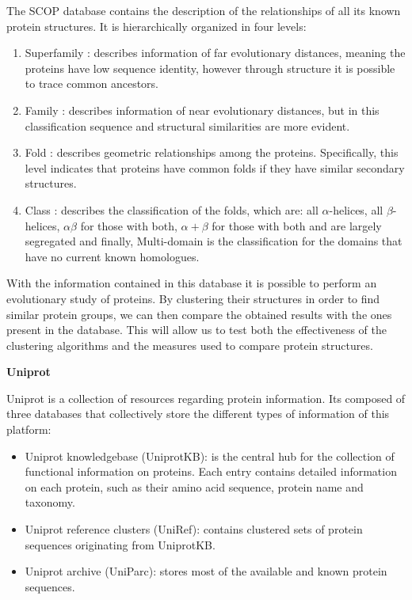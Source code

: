 The \gls{SCOP} \cite{murzin1995scop} database contains the description of the relationships of all its known protein structures. It is hierarchically organized in four levels:
\begin{enumerate}
	\item Superfamily : describes information of far evolutionary distances, meaning the proteins have low sequence identity, however through structure it is possible to trace common ancestors.
	\item Family : describes information of near evolutionary distances, but in this classification sequence and structural similarities are more evident.
	\item Fold : describes geometric relationships among the proteins. Specifically, this level indicates that proteins have common folds if they have similar secondary structures.
	\item Class : describes the classification of the folds, which are: all $\alpha$-helices, all $\beta$-helices, $\alpha \beta$ for those with both, $\alpha + \beta$ for those with both and are largely segregated and finally, Multi-domain is the classification for the domains that have no current known homologues.  
\end{enumerate}

With the information contained in this database it is possible to perform an evolutionary study of proteins. By clustering their structures in order to find similar protein groups, we can then compare the obtained results with the ones present in the database. This will allow us to test both the effectiveness of the clustering algorithms and the measures used to compare protein structures.
 
\medskip
\textbf{Uniprot}

Uniprot \cite{uniprot2014uniprot} is a collection of resources regarding protein information. Its composed of three databases that collectively store the different types of information of this platform:

\begin{itemize}
	\item Uniprot knowledgebase (UniprotKB): is the central hub for the collection of functional information on proteins. Each entry contains detailed information on each protein, such as their amino acid sequence, protein name and taxonomy.
	\item Uniprot reference clusters (UniRef): contains clustered sets of protein sequences originating from UniprotKB.
	\item Uniprot archive (UniParc): stores most of the available and known protein sequences.
\end{itemize}

